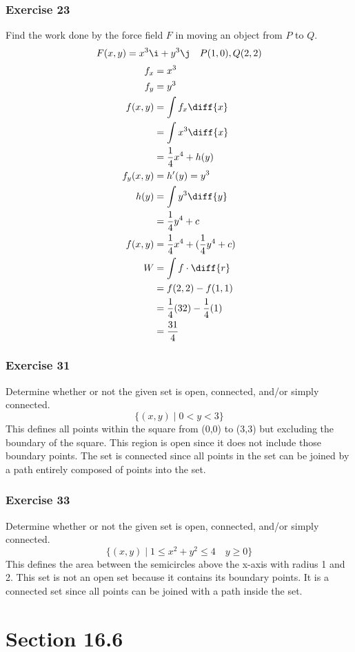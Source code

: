\documentclass{math}
\begin{document}
\subsubsection*{Exercise 23}
Find the work done by the force field \( F \) in moving an object from \( P \)
to \( Q \).
\[ F(x,y) = x^3\i+y^3\j \quad P(1,0),Q(2,2) \]
\begin{align*}
  f_x &= x^3 \\
  f_y &= y^3 \\
  f(x,y) &= \int f_x\diff{x} \\
  &= \int x^3\diff{x} \\
  &= \frac{1}{4}x^4+h(y) \\
  f_y(x,y) &= h'(y) = y^3 \\
  h(y) &= \int y^3\diff{y} \\
  &= \frac{1}{4}y^4+c \\
  f(x,y) &= \frac{1}{4}x^4+(\frac{1}{4}y^4+c) \\
  W &= \int f\cdot\diff{r} \\
  &= f(2,2)-f(1,1) \\
  &= \frac{1}{4}(32)-\frac{1}{4}(1) \\
  &= \frac{31}{4}
\end{align*}

\subsubsection*{Exercise 31}
Determine whether or not the given set is open, connected, and/or simply
connected.
\[ \{(x,y)\mid0<y<3\} \]
This defines all points within the square from (0,0) to (3,3) but excluding
the boundary of the square. This region is open since it does not include those
boundary points. The set is connected since all points in the set can be joined
by a path entirely composed of points into the set.

\subsubsection*{Exercise 33}
Determine whether or not the given set is open, connected, and/or simply
connected.
\[ \{(x,y)\mid1\le x^2+y^2\le 4\quad y\ge0\} \]
This defines the area between the semicircles above the x-axis with radius 1 and
2. This set is not an open set because it contains its boundary points. It is
a connected set since all points can be joined with a path inside the set.

\section*{Section 16.6}
\end{document}
